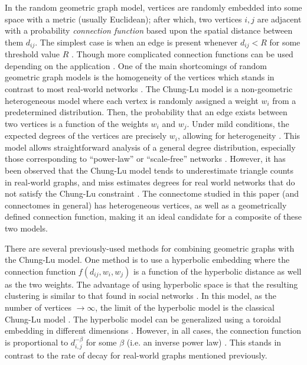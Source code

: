 \documentclass[11]{article}
\theoremstyle{remark}
\theoremstyle{definition}
\begin{document}
In the random geometric graph model, vertices are randomly embedded into some space with a metric (usually Euclidean); after which, two vertices $i, j$ are adjacent with a probability {\it connection function} based upon the spatial distance between them $d_{ij}$. The simplest case is when an edge is present whenever $d_{ij} < R$ for some threshold value $R$ \cite{hardpenrose}. Though more complicated connection functions can be used depending on the application \cite{softpenrose, generalconnection}. One of the main shortcomings of random geometric graph models is the homogeneity of the vertices which stands in contrast to most real-world networks \cite{estradahetero}. The Chung-Lu model \cite{chunglu} is a non-geometric heterogeneous model where each vertex is randomly assigned a weight $w_i$ from a predetermined distribution. Then, the probability that an edge exists between two vertices is a function of the weights $w_i$ and $w_j$. Under mild conditions, the expected degrees of the vertices are precisely $w_i$, allowing for heterogeneity \cite{chunglu}. This model allows straightforward analysis of a general degree distribution, especially those corresponding to ``power-law'' or ``scale-free'' networks \cite{chunglu}. However, it has been observed that the Chung-Lu model tends to underestimate triangle counts in real-world graphs, and miss estimates degrees for real world networks that do not satisfy the Chung-Lu constraint
\cite{notchunglu}. The connectome studied in this paper (and connectomes in general) has heterogeneous vertices, as well as a geometrically defined connection function, making it an ideal candidate for a composite of these two models.

There are several previously-used methods for combining geometric graphs with the Chung-Lu model. One method is to use a hyperbolic embedding where the connection function $f(d_{ij},w_i,w_j)$ is a function of the hyperbolic distance as well as the two weights. The advantage of using hyperbolic space is that the resulting clustering is similar to that found in social networks \cite{hyperbolicsolcial}. In this model, as the number of vertices $\to \infty$, the limit of the hyperbolic model is the classical Chung-Lu model  \cite{hyperchunglu}. The hyperbolic model can be generalized using a toroidal embedding in different dimensions \cite{bringmann2019geometric}. However, in all cases, the connection function is proportional to  $d_{i,j}^{-\beta}$ for some $\beta$ (i.e. an inverse power law) \cite{bringmann2019geometric}. This stands in contrast to the rate of decay for real-world graphs mentioned previously.  
\end{document}
